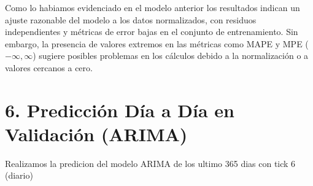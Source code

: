 \documentclass[
]{book}
\begin{document}
Como lo habiamos evidenciado en el modelo anterior los resultados indican un ajuste razonable del modelo a los datos normalizados, con residuos independientes y métricas de error bajas en el conjunto de entrenamiento. Sin embargo, la presencia de valores extremos en las métricas como MAPE y MPE (\(-\infty, \infty\)) sugiere posibles problemas en los cálculos debido a la normalización o a valores cercanos a cero.

\section{6. Predicción Día a Día en Validación (ARIMA)}\label{predicciuxf3n-duxeda-a-duxeda-en-validaciuxf3n-arima}

Realizamos la predicion del modelo ARIMA de los ultimo 365 dias con tick 6 (diario)
\end{document}
